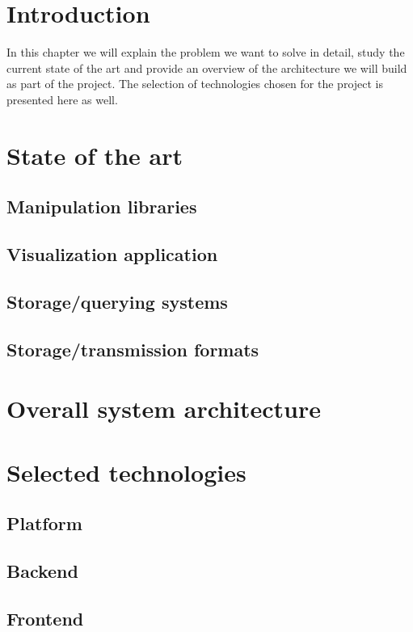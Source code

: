 
\section{Introduction}
  
In this chapter we will explain the problem we want to solve in detail, study the current state of the art and provide an overview of the architecture we will build as part of the project. The selection of technologies chosen for the project is presented here as well.


\section{State of the art}
\label{sec:case/art}

\subsection{Manipulation libraries}
\subsection{Visualization application}
\subsection{Storage/querying systems}
\subsection{Storage/transmission formats}
\label{sec:case/art/formats}

\section{Overall system architecture}
\label{sec:case/arch}

\section{Selected technologies}
\label{sec:case/tech}

\subsection{Platform}
\subsection{Backend}
\subsection{Frontend}
